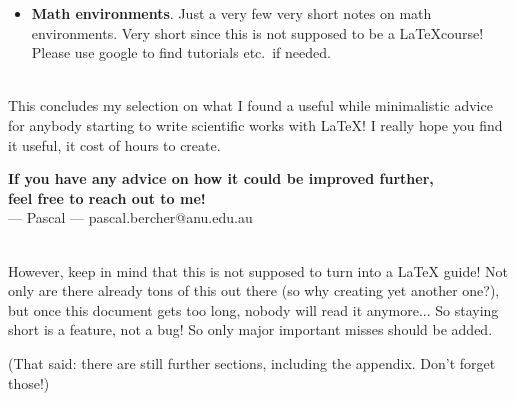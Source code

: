 \begin{itemize}
  \item \textbf{Math environments}. Just a very few very short notes on math environments. Very short since this is not supposed to be a \LaTeX{course}! Please use google to find tutorials etc.\ if needed.
\end{itemize}

\ \\[2em]
This concludes my selection on what I found a useful while minimalistic advice for anybody starting to write scientific works with \LaTeX! I really hope you find it useful, it cost of hours to create.

\textbf{If you have any advice on how it could be improved further,\\
feel free to reach out to me!}\\[.5em]
--- Pascal --- \hfill pascal.bercher@anu.edu.au

\ \\
However, keep in mind that this is not supposed to turn into a \LaTeX{} guide! Not only are there already tons of this out there (so why creating yet another one?), but once this document gets too long, nobody will read it anymore... So staying short is a feature, not a bug! So only major important misses should be added.

(That said: there are still further sections, including the appendix. Don't forget those!)

